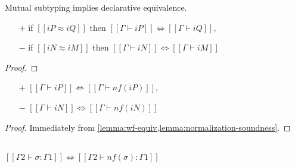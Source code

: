 \begin{lemma}
  \label{lemma:wf-equiv}
  Mutual subtyping implies declarative equivalence.
  \begin{itemize}
  \item[$+$] if $[[iP ≈ iQ]]$ then $[[Γ ⊢ iP]] \iff [[Γ ⊢ iQ]]$,
  \item[$-$] if $[[iN ≈ iM]]$ then $[[Γ ⊢ iN]] \iff [[Γ ⊢ iM]]$
  \end{itemize}
\end{lemma}
\begin{proof}
\end{proof}

\begin{corollary}
  \label{corollary:wf-nf}
  \hfill
  \begin{itemize}
  \item[$+$] $[[Γ ⊢ iP]] \iff [[Γ ⊢ nf(iP)]]$,
  \item[$-$] $[[Γ ⊢ iN]] \iff [[Γ ⊢ nf(iN)]]$
  \end{itemize}
\end{corollary}
\begin{proof}
  Immediately from \cref{lemma:wf-equiv,lemma:normalization-soundness}.
\end{proof}

\begin{corollary}
  \label{corollary:wf-s-nf}
  \hfill \\
   $[[Γ2 ⊢ σ : Γ1]] \iff [[Γ2 ⊢ nf(σ) : Γ1]]$
\end{corollary}

